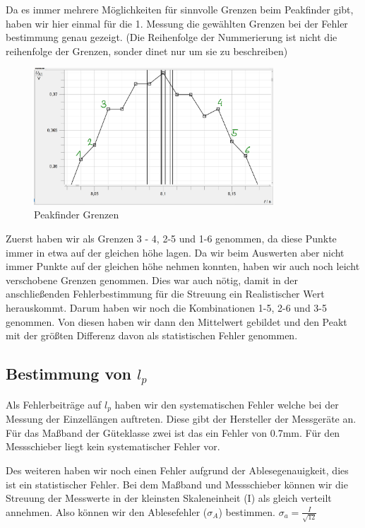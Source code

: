 \documentclass[twoside]{protokoll}
\begin{document}
Da es immer mehrere Möglichkeiten für sinnvolle Grenzen beim Peakfinder gibt, haben wir hier einmal für die 1. Messung die gewählten Grenzen bei der Fehler bestimmung genau gezeigt.
(Die Reihenfolge der Nummerierung ist nicht die reihenfolge der Grenzen, sonder dinet nur um sie zu beschreiben)
\begin{figure}[H]
    \centering
    \includegraphics[width=0.8\textwidth]{plots/unsicherheit-bestimmen-stange1-punkte.pdf}
    \caption{Peakfinder Grenzen}
     
\end{figure}
Zuerst haben wir als Grenzen 3 - 4, 2-5 und 1-6 genommen, da diese Punkte immer in etwa auf der gleichen höhe lagen.
Da wir beim Auswerten aber nicht immer Punkte auf der gleichen höhe nehmen konnten, haben wir auch noch leicht verschobene Grenzen genommen.
Dies war auch nötig, damit in der anschließenden Fehlerbestimmung für die Streuung ein Realistischer Wert herauskommt.
Darum haben wir noch die Kombinationen 1-5, 2-6 und 3-5 genommen.
Von diesen haben wir dann den Mittelwert gebildet und den Peakt mit der größten Differenz davon als statistischen Fehler genommen.


\subsection{Bestimmung von $l_p$}

Als Fehlerbeiträge auf $l_p$ haben wir den systematischen Fehler welche bei der Messung der Einzellängen auftreten.
Diese gibt der Hersteller der Messgeräte an. 
Für das Maßband der Güteklasse zwei ist das ein Fehler von 0.7mm. 
Für den Messschieber liegt kein systematischer Fehler vor.

Des weiteren haben wir noch einen Fehler aufgrund der Ablesegenauigkeit, dies ist ein statistischer Fehler.
Bei dem Maßband und Messschieber können wir die Streuung der Messwerte in der kleinsten Skaleneinheit (I) als gleich verteilt annehmen. 
Also können wir den Ablesefehler ($\sigma_A$) bestimmen. $\sigma_a = \frac{I}{\sqrt{12}}$\\
\end{document}

